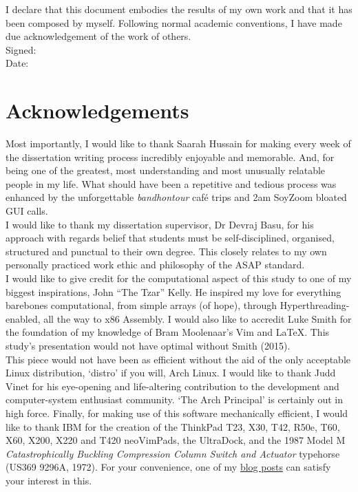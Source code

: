 \documentclass[11pt, english]{article}
\begin{document}
	I declare that this document embodies the results of my own work and that it has been composed by myself. Following normal academic conventions, I have made due acknowledgement of the work of others.\\

	Signed:\\ 

	Date:

\newpage

	\section*{Acknowledgements}

	Most importantly, I would like to thank Saarah Hussain for making every week of the dissertation writing process incredibly enjoyable and memorable. And, for being one of the greatest, most understanding and most unusually relatable people in my life. What should have been a repetitive and tedious process was enhanced by the unforgettable \textit{bandhontour} caf\'{e} trips and 2am SoyZoom bloated GUI calls.\\

I would like to thank my dissertation supervisor, Dr Devraj Basu, for his approach with regards belief that students must be self-disciplined, organised, structured and punctual to their own degree. This closely relates to my own personally practiced work ethic and philosophy of the ASAP standard.\\

I would like to give credit for the computational aspect of this study to one of my biggest inspirations, John ``The Tzar'' Kelly. He inspired my love for everything barebones computational, from simple arrays (of hope), through Hyperthreading-enabled, all the way to x86 Assembly. I would also like to accredit Luke Smith for the foundation of my knowledge of Bram Moolenaar’s Vim and {\LaTeX}. This study’s presentation would not have optimal without Smith (2015).\\

This piece would not have been as efficient without the aid of the only acceptable Linux distribution, `distro’ if you will, Arch Linux. I would like to thank Judd Vinet for his eye-opening and life-altering contribution to the development and computer-system enthusiast community. ‘The Arch Principal’ is certainly out in high force. Finally, for making use of this software mechanically efficient, I would like to thank IBM for the creation of the ThinkPad T23, X30, T42, R50e, T60, X60, X200, X220 and T420 neoVimPads, the UltraDock, and the 1987 Model M \textit{Catastrophically Buckling Compression Column Switch and Actuator} typehorse (US369 9296A, 1972). For your convenience, one of my \href{http://lewisbritton.com/blog_tp.html}{blog posts} can satisfy your interest in this. 
\end{document}
